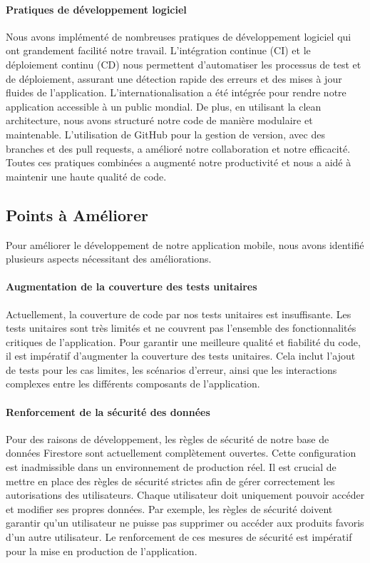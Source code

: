 \paragraph{Pratiques de développement logiciel}
Nous avons implémenté de nombreuses pratiques de développement logiciel qui ont grandement facilité notre travail. L'intégration continue (CI) et le déploiement continu (CD) nous permettent d'automatiser les processus de test et de déploiement, assurant une détection rapide des erreurs et des mises à jour fluides de l'application. L'internationalisation a été intégrée pour rendre notre application accessible à un public mondial. De plus, en utilisant la clean architecture, nous avons structuré notre code de manière modulaire et maintenable. L'utilisation de GitHub pour la gestion de version, avec des branches et des pull requests, a amélioré notre collaboration et notre efficacité. Toutes ces pratiques combinées a augmenté notre productivité et nous a aidé à maintenir une haute qualité de code.





\subsection{Points à Améliorer}

Pour améliorer le développement de notre application mobile, nous avons identifié plusieurs aspects nécessitant des améliorations.

\paragraph{Augmentation de la couverture des tests unitaires}
Actuellement, la couverture de code par nos tests unitaires est insuffisante. Les tests unitaires sont très limités et ne couvrent pas l'ensemble des fonctionnalités critiques de l'application. Pour garantir une meilleure qualité et fiabilité du code, il est impératif d'augmenter la couverture des tests unitaires. Cela inclut l'ajout de tests pour les cas limites, les scénarios d'erreur, ainsi que les interactions complexes entre les différents composants de l'application.

\paragraph{Renforcement de la sécurité des données}
Pour des raisons de développement, les règles de sécurité de notre base de données Firestore sont actuellement complètement ouvertes. Cette configuration est inadmissible dans un environnement de production réel. Il est crucial de mettre en place des règles de sécurité strictes afin de gérer correctement les autorisations des utilisateurs. Chaque utilisateur doit uniquement pouvoir accéder et modifier ses propres données. Par exemple, les règles de sécurité doivent garantir qu'un utilisateur ne puisse pas supprimer ou accéder aux produits favoris d'un autre utilisateur. Le renforcement de ces mesures de sécurité est impératif pour la mise en production de l'application.

